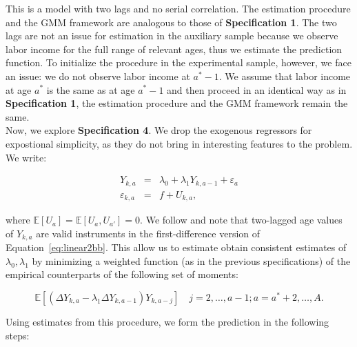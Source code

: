 \noindent This is a model with two lags and no serial correlation. The estimation procedure and the GMM framework are analogous to those of \textbf{Specification 1}. The two lags are not an issue for estimation in the auxiliary sample because we observe labor income for the full range of relevant ages, thus we estimate the prediction function. To initialize the procedure in the experimental sample, however, we face an issue: we do not observe labor income at $a^* - 1$. We assume that labor income at age $a^*$ is the same as at age $a^* - 1$ and then proceed in an identical way as in \textbf{Specification 1}, the estimation procedure and the GMM framework remain the same.\\

\noindent Now, we explore \textbf{Specification 4}. We drop the exogenous regressors for expostional simplicity, as they do not bring in interesting features to the problem. We write:

\begin{eqnarray}
Y_{k,a} &=& \lambda_{0} + \lambda_{1} Y_{k,a-1} + \varepsilon_{a} \label{eq:linear1bb} \\
\varepsilon_{k,a} &=& f + U_{k,a}, \label{eq:linear2bb}
\end{eqnarray}

\noindent where $\mathbb{E}[U_{a}] = \mathbb{E}[U_{a}, U_{a'}] = 0$. We follow \citet{Arellano_1991_Some-Tests} and note that two-lagged age values of $Y_{k,a}$ are valid instruments in the first-difference version of Equation~\eqref{eq:linear2bb}. This allow us to estimate obtain consistent estimates of $\lambda_{0}, \lambda_{1}$ by minimizing a weighted function (as in the previous specifications) of the empirical counterparts of the following set of moments:

\begin{equation}
\mathbb{E} \left[ \left( \Delta Y_{k,a} -  \lambda_{1} \Delta Y_{k,a-1} \right)   Y_{k,a - j} \right] \quad j = 2, \ldots, a - 1; a = a^*+ 2, \ldots, A. \label{eq:abmoment}
\end{equation}

\noindent Using estimates from this procedure, we form the prediction in the following steps:

